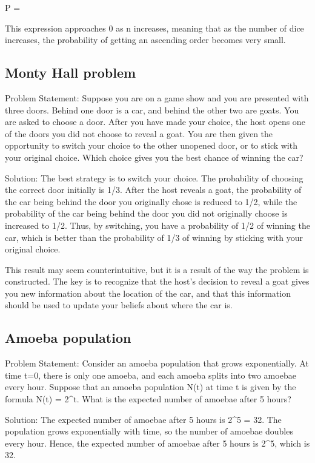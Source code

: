 \documentclass[12pt, a4paper, oneside]{article}
\begin{document}
P = 

This expression approaches 0 as n increases, meaning that as the number of dice increases, the probability of getting an ascending order becomes very small.





\subsection{ Monty Hall problem }
Problem Statement:
Suppose you are on a game show and you are presented with three doors. Behind one door is a car, and behind the other two are goats. You are asked to choose a door. After you have made your choice, the host opens one of the doors you did not choose to reveal a goat. You are then given the opportunity to switch your choice to the other unopened door, or to stick with your original choice. Which choice gives you the best chance of winning the car?

Solution:
The best strategy is to switch your choice. The probability of choosing the correct door initially is 1/3. After the host reveals a goat, the probability of the car being behind the door you originally chose is reduced to 1/2, while the probability of the car being behind the door you did not originally choose is increased to 1/2. Thus, by switching, you have a probability of 1/2 of winning the car, which is better than the probability of 1/3 of winning by sticking with your original choice.

This result may seem counterintuitive, but it is a result of the way the problem is constructed. The key is to recognize that the host's decision to reveal a goat gives you new information about the location of the car, and that this information should be used to update your beliefs about where the car is.
\subsection{ Amoeba population }
Problem Statement:
Consider an amoeba population that grows exponentially. At time t=0, there is only one amoeba, and each amoeba splits into two amoebae every hour. Suppose that an amoeba population N(t) at time t is given by the formula N(t) = 2^t. What is the expected number of amoebae after 5 hours?

Solution:
The expected number of amoebae after 5 hours is 2^5 = 32. The population grows exponentially with time, so the number of amoebae doubles every hour. Hence, the expected number of amoebae after 5 hours is 2^5, which is 32.
\end{document}
